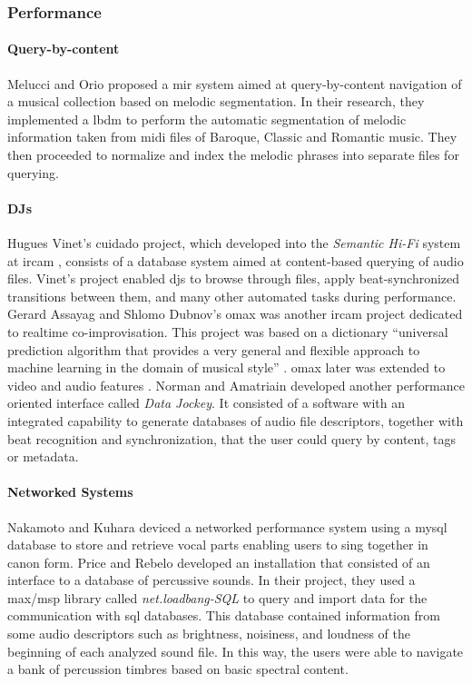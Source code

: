 \subsubsection{Performance}
\label{application:performance}

\paragraph{Query-by-content}
Melucci and Orio \parencite{icmc/bbp2372.1999.355} proposed a \gls{mir} system aimed at query-by-content navigation of a musical collection based on melodic segmentation. In their research, they implemented a \gls{lbdm} to perform the automatic segmentation of melodic information taken from \gls{midi} files of Baroque, Classic and Romantic music. They then proceeded to normalize and index the melodic phrases into separate files for querying.

\paragraph{DJs}
Hugues Vinet's \gls{cuidado} project, which developed into the \textit{Semantic Hi-Fi} system at \gls{ircam} \parencite{DBLP:conf/ismir/VinetHP02, DBLP:conf/icmc/VinetHP02, DBLP:conf/icmc/Vinet05}, consists of a database system aimed at content-based querying of audio files. Vinet's project enabled \glspl{dj} to browse through files, apply beat-synchronized transitions between them, and many other automated tasks during performance. Gerard Assayag and Shlomo Dubnov's \gls{omax} was another \gls{ircam} project dedicated to realtime co-improvisation. This project was based on a dictionary ``universal prediction algorithm that provides a very general and flexible approach to machine learning in the domain of musical style'' \parencite{DBLP:conf/icmc/AssayagDD99}. \gls{omax} later was extended to video and audio features \parencite{DBLP:conf/icmc/BlochD08}. Norman and Amatriain \parencite{icmc/bbp2372.2007.117} developed another performance oriented interface called \textit{Data Jockey}. It consisted of a software with an integrated capability to generate databases of audio file descriptors, together with beat recognition and synchronization, that the user could query by content, tags or metadata.

\paragraph{Networked Systems}
Nakamoto and Kuhara \parencite{Nakamoto2007} deviced a networked performance system using a \gls{mysql} database to store and retrieve vocal parts enabling users to sing together in canon form. Price and Rebelo \parencite{Price2008} developed an installation that consisted of an interface to a database of percussive sounds. In their project, they used a \gls{max/msp} library called \textit{net.loadbang-SQL} to query and import data for the communication with \gls{sql} databases. This database contained information from some audio descriptors such as brightness, noisiness, and loudness of the beginning of each analyzed sound file. In this way, the users were able to navigate a bank of percussion timbres based on basic spectral content. 

